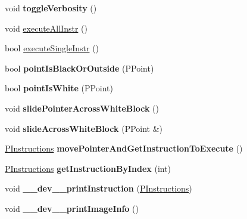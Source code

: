 \begin{CompactItemize}
\item 
\hypertarget{classPVirtualMachine_1e48dcf68b3b80d7f6d3c67b3f796e51}{
void \textbf{toggleVerbosity} ()}
\label{classPVirtualMachine_1e48dcf68b3b80d7f6d3c67b3f796e51}

\item 
void \hyperlink{classPVirtualMachine_40e1780e122ce7fe4ebadc526c47fbea}{executeAllInstr} ()
\item 
bool \hyperlink{classPVirtualMachine_7bbb22aabe782de2208139bc01f65050}{executeSingleInstr} ()
\item 
\hypertarget{classPVirtualMachine_6daa9fea05af4bfc30b881c893fbd725}{
bool \textbf{pointIsBlackOrOutside} (PPoint)}
\label{classPVirtualMachine_6daa9fea05af4bfc30b881c893fbd725}

\item 
\hypertarget{classPVirtualMachine_cae537f70c35487220818e8d18978e07}{
bool \textbf{pointIsWhite} (PPoint)}
\label{classPVirtualMachine_cae537f70c35487220818e8d18978e07}

\item 
\hypertarget{classPVirtualMachine_e37d4dfa512c3dd97b9958f013ffb7b3}{
void \textbf{slidePointerAcrossWhiteBlock} ()}
\label{classPVirtualMachine_e37d4dfa512c3dd97b9958f013ffb7b3}

\item 
\hypertarget{classPVirtualMachine_4b2ebb998393324c5240dc48fdb14f3a}{
void \textbf{slideAcrossWhiteBlock} (PPoint \&)}
\label{classPVirtualMachine_4b2ebb998393324c5240dc48fdb14f3a}

\item 
\hypertarget{classPVirtualMachine_29279548406a588bce03e320354cd857}{
\hyperlink{penums_8h_797d2a71195500b970298fbf455ff83a}{PInstructions} \textbf{movePointerAndGetInstructionToExecute} ()}
\label{classPVirtualMachine_29279548406a588bce03e320354cd857}

\item 
\hypertarget{classPVirtualMachine_69d12176d3f9719b2bdf93a9f55cefde}{
\hyperlink{penums_8h_797d2a71195500b970298fbf455ff83a}{PInstructions} \textbf{getInstructionByIndex} (int)}
\label{classPVirtualMachine_69d12176d3f9719b2bdf93a9f55cefde}

\item 
\hypertarget{classPVirtualMachine_91c888349242ed7700d5ddff5b187c19}{
void \textbf{\_\-\_\-dev\_\-\_\-printInstruction} (\hyperlink{penums_8h_797d2a71195500b970298fbf455ff83a}{PInstructions})}
\label{classPVirtualMachine_91c888349242ed7700d5ddff5b187c19}

\item 
\hypertarget{classPVirtualMachine_d0ac4994cbf5c218a40442df49a3cd29}{
void \textbf{\_\-\_\-dev\_\-\_\-printImageInfo} ()}
\label{classPVirtualMachine_d0ac4994cbf5c218a40442df49a3cd29}


\end{CompactItemize}
